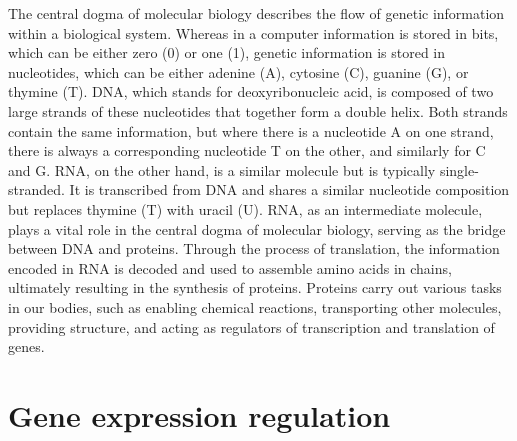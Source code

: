 The central dogma of molecular biology describes the flow of genetic information within a biological system. Whereas in a computer information is stored in bits, which can be either zero (0) or one (1), genetic information is stored in nucleotides, which can be either adenine (A), cytosine (C), guanine (G), or thymine (T). DNA, which stands for deoxyribonucleic acid, is composed of two large strands of these nucleotides that together form a double helix. Both strands contain the same information, but where there is a nucleotide A on one strand, there is always a corresponding nucleotide T on the other, and similarly for C and G. RNA, on the other hand, is a similar molecule but is typically single-stranded. It is transcribed from DNA and shares a similar nucleotide composition but replaces thymine (T) with uracil (U). RNA, as an intermediate molecule, plays a vital role in the central dogma of molecular biology, serving as the bridge between DNA and proteins. Through the process of translation, the information encoded in RNA is decoded and used to assemble amino acids in chains, ultimately resulting in the synthesis of proteins. Proteins carry out various tasks in our bodies, such as enabling chemical reactions, transporting other molecules, providing structure, and acting as regulators of transcription and translation of genes.





\section{Gene expression regulation}

